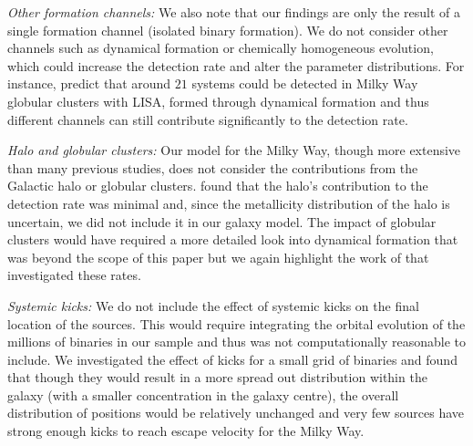 \textit{Other formation channels:} We also note that our findings are only the result of a single formation channel (isolated binary formation). We do not consider other channels such as dynamical formation or chemically homogeneous evolution, which could increase the detection rate and alter the parameter distributions. For instance, \citet{Kremer+2018} predict that around $21$ systems could be detected in Milky Way globular clusters with LISA, formed through dynamical formation and thus different channels can still contribute significantly to the detection rate.

\textit{Halo and globular clusters:} Our model for the Milky Way, though more extensive than many previous studies, does not consider the contributions from the Galactic halo or globular clusters. \citet{Lamberts+2018} found that the halo's contribution to the detection rate was minimal and, since the metallicity distribution of the halo is uncertain, we did not include it in our galaxy model. The impact of globular clusters would have required a more detailed look into dynamical formation that was beyond the scope of this paper but we again highlight the work of \citet{Kremer+2018} that investigated these rates. 

\textit{Systemic kicks:} We do not include the effect of systemic kicks on the final location of the sources. This would require integrating the orbital evolution of the millions of binaries in our sample and thus was not computationally reasonable to include. We investigated the effect of kicks for a small grid of binaries and found that though they would result in a more spread out distribution within the galaxy (with a smaller concentration in the galaxy centre), the overall distribution of positions would be relatively unchanged and very few sources have strong enough kicks to reach escape velocity for the Milky Way.

